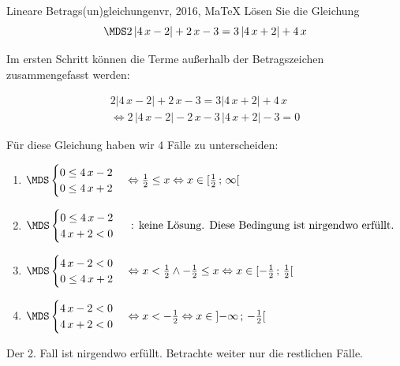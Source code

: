  \providecommand{\MoIl}[1][]{\mbox{}#1]\mathopen{}} 
 \providecommand{\MoIr}[1][]{#1[\mbox{}} 
 \providecommand{\MIntvlSep}{;} 
 \providecommand{\MElSetSep}{\, ; \, } 
 \begin{MAufgabe}{Lineare Betrags(un)gleichungen}{vr, 2016, MaTeX}
L\"osen Sie die Gleichung
$$
 \MDS 2\left| 4\, x - 2 \right|+2\, x - 3= 3 \left| 4\, x + 2 \right| +4\, x
$$  

\ifLsg\MLoesung

Im ersten Schritt k\"onnen die Terme au\ss{}erhalb der Betragszeichen zusammengefasst werden:

\begin{align*} 
 2\left| 4\, x - 2 \right|+2\, x - 3= 3 \left| 4\, x + 2 \right| +4\, x\\ 
\Leftrightarrow2\, \left|4\, x - 2\right| - 2\, x - 3\, \left|4\, x + 2\right| - 3= 0 
 \end{align*}

F\"ur diese Gleichung haben wir 4 F\"alle zu unterscheiden: 
\begin{enumerate}
\item $ \MDS 
\begin{cases} 
 0 \leq 4\, x - 2\\ 
0 \leq 4\, x + 2
 \end{cases}
\Leftrightarrow \frac{1}{2} \leq x\Leftrightarrow x \in [ \frac{1}{2} \, \MIntvlSep \, \infty\MoIr $ 
\item $ \MDS 
\begin{cases} 
 0 \leq 4\, x - 2\\ 
4\, x + 2 < 0
 \end{cases}
 \mbox{ : keine L\"osung. Diese Bedingung ist nirgendwo erf\"ullt.}$ 
\item $ \MDS 
\begin{cases} 
 4\, x - 2 < 0\\ 
0 \leq 4\, x + 2
 \end{cases}
\Leftrightarrow x < \frac{1}{2} \wedge - \frac{1}{2} \leq x\Leftrightarrow x \in [ - \frac{1}{2} \, \MIntvlSep \, \frac{1}{2}\MoIr $ 
\item $ \MDS 
\begin{cases} 
 4\, x - 2 < 0\\ 
4\, x + 2 < 0
 \end{cases}
\Leftrightarrow x < - \frac{1}{2}\Leftrightarrow x \in \MoIl  -\infty \, \MIntvlSep \, - \frac{1}{2}\MoIr $ 
\end{enumerate} 
Der 2. Fall ist nirgendwo erf\"ullt. Betrachte weiter nur die restlichen F\"alle.
 

\end{MAufgabe}
